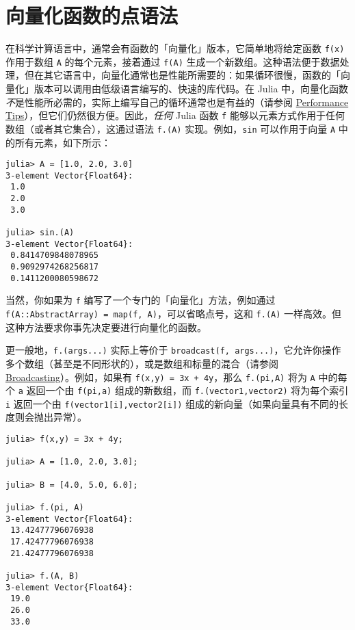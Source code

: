 \hypertarget{13590013989415065742}{}


\section{向量化函数的点语法}



在科学计算语言中，通常会有函数的「向量化」版本，它简单地将给定函数 \texttt{f(x)} 作用于数组 \texttt{A} 的每个元素，接着通过 \texttt{f(A)} 生成一个新数组。这种语法便于数据处理，但在其它语言中，向量化通常也是性能所需要的：如果循环很慢，函数的「向量化」版本可以调用由低级语言编写的、快速的库代码。在 Julia 中，向量化函数\emph{不}是性能所必需的，实际上编写自己的循环通常也是有益的（请参阅 \hyperlink{818954303942149020}{Performance Tips}），但它们仍然很方便。因此，\emph{任何} Julia 函数 \texttt{f} 能够以元素方式作用于任何数组（或者其它集合），这通过语法 \texttt{f.(A)} 实现。例如，\texttt{sin} 可以作用于向量 \texttt{A} 中的所有元素，如下所示：




\begin{verbatim}
julia> A = [1.0, 2.0, 3.0]
3-element Vector{Float64}:
 1.0
 2.0
 3.0

julia> sin.(A)
3-element Vector{Float64}:
 0.8414709848078965
 0.9092974268256817
 0.1411200080598672
\end{verbatim}



当然，你如果为 \texttt{f} 编写了一个专门的「向量化」方法，例如通过 \texttt{f(A::AbstractArray) = map(f, A)}，可以省略点号，这和 \texttt{f.(A)} 一样高效。但这种方法要求你事先决定要进行向量化的函数。



更一般地，\texttt{f.(args...)} 实际上等价于 \texttt{broadcast(f, args...)}，它允许你操作多个数组（甚至是不同形状的），或是数组和标量的混合（请参阅 \hyperlink{1924664524817847375}{Broadcasting}）。例如，如果有 \texttt{f(x,y) = 3x + 4y}，那么 \texttt{f.(pi,A)} 将为 \texttt{A} 中的每个 \texttt{a} 返回一个由 \texttt{f(pi,a)} 组成的新数组，而 \texttt{f.(vector1,vector2)} 将为每个索引 \texttt{i} 返回一个由 \texttt{f(vector1[i],vector2[i])} 组成的新向量（如果向量具有不同的长度则会抛出异常）。




\begin{verbatim}
julia> f(x,y) = 3x + 4y;

julia> A = [1.0, 2.0, 3.0];

julia> B = [4.0, 5.0, 6.0];

julia> f.(pi, A)
3-element Vector{Float64}:
 13.42477796076938
 17.42477796076938
 21.42477796076938

julia> f.(A, B)
3-element Vector{Float64}:
 19.0
 26.0
 33.0
\end{verbatim}



